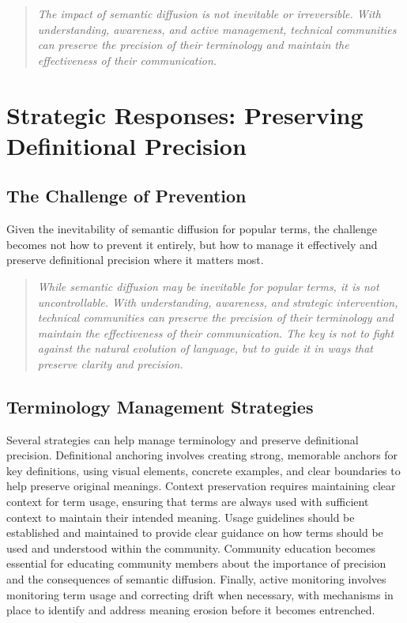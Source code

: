\documentclass[11pt]{article}
\begin{document}
\begin{quote}
\emph{The impact of semantic diffusion is not inevitable or irreversible. With understanding, awareness, and active management, technical communities can preserve the precision of their terminology and maintain the effectiveness of their communication.}
\end{quote}

\section{Strategic Responses: Preserving Definitional Precision}

\subsection{The Challenge of Prevention}

Given the inevitability of semantic diffusion for popular terms, the challenge becomes not how to prevent it entirely, but how to manage it effectively and preserve definitional precision where it matters most.

\begin{quote}
\emph{While semantic diffusion may be inevitable for popular terms, it is not uncontrollable. With understanding, awareness, and strategic intervention, technical communities can preserve the precision of their terminology and maintain the effectiveness of their communication. The key is not to fight against the natural evolution of language, but to guide it in ways that preserve clarity and precision.}
\end{quote}

\subsection{Terminology Management Strategies}

Several strategies can help manage terminology and preserve definitional precision. Definitional anchoring involves creating strong, memorable anchors for key definitions, using visual elements, concrete examples, and clear boundaries to help preserve original meanings. Context preservation requires maintaining clear context for term usage, ensuring that terms are always used with sufficient context to maintain their intended meaning. Usage guidelines should be established and maintained to provide clear guidance on how terms should be used and understood within the community. Community education becomes essential for educating community members about the importance of precision and the consequences of semantic diffusion. Finally, active monitoring involves monitoring term usage and correcting drift when necessary, with mechanisms in place to identify and address meaning erosion before it becomes entrenched.
\end{document}

